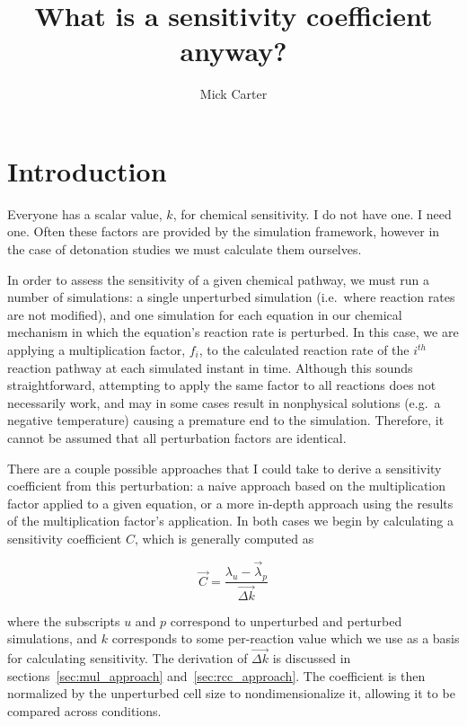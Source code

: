 \documentclass{article}
\title{What is a sensitivity coefficient anyway?}
\author{Mick Carter}
\date{}
\begin{document}
\maketitle

\section{Introduction}
\label{sec:introduction}

Everyone has a scalar value, $k$, for chemical sensitivity.
I do not have one.
I need one.
Often these factors are provided by the simulation framework, however in the case of detonation studies we must calculate them ourselves.

In order to assess the sensitivity of a given chemical pathway, we must run a number of simulations: a single unperturbed simulation (i.e.\ where reaction rates are not modified), and one simulation for each equation in our chemical mechanism in which the equation's reaction rate is perturbed.
In this case, we are applying a multiplication factor, $f_{i}$, to the calculated reaction rate of the $i^{th}$ reaction pathway at each simulated instant in time.
Although this sounds straightforward, attempting to apply the same factor to all reactions does not necessarily work, and may in some cases result in nonphysical solutions (e.g.\ a negative temperature) causing a premature end to the simulation.
Therefore, it cannot be assumed that all perturbation factors are identical.

There are a couple possible approaches that I could take to derive a sensitivity coefficient from this perturbation: a naive approach based on the multiplication factor applied to a given equation, or a more in-depth approach using the results of the multiplication factor's application.
In both cases we begin by calculating a sensitivity coefficient $C$, which is generally computed as

\begin{equation}
    \label{eq:sc_base}
    \overrightarrow{C} = \frac{\lambda_{u} - \overrightarrow{\lambda}_{p}}{\overrightarrow{\Delta k}}
\end{equation}

\noindent where the subscripts $u$ and $p$ correspond to unperturbed and perturbed simulations, and $k$ corresponds to some per-reaction value which we use as a basis for calculating sensitivity.
The derivation of $\overrightarrow{\Delta k}$ is discussed in sections~\ref{sec:mul_approach} and~\ref{sec:rcc_approach}.
The coefficient is then normalized by the unperturbed cell size to nondimensionalize it, allowing it to be compared across conditions.
\end{document}
